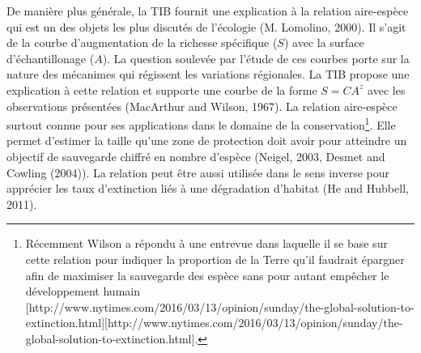 De manière plus générale, la TIB fournit une explication à la relation
aire-espèce qui est un des objets les plus discutés de l'écologie (M.
Lomolino, 2000). Il s'agit de la courbe d'augmentation de la richesse
spécifique (\(S\)) avec la surface d'échantillonage (\(A\)). La question
soulevée par l'étude de ces courbes porte sur la nature des mécanimes
qui régissent les variations régionales. La TIB propose une explication
à cette relation et supporte une courbe de la forme \(S=CA^z\) avec les
observations présentées (MacArthur and Wilson, 1967). La relation
aire-espèce surtout connue pour ses applications dans le domaine de la
conservation\footnote{Récemment Wilson a répondu à une entrevue dans
  laquelle il se base sur cette relation pour indiquer la proportion de
  la Terre qu'il faudrait épargner afin de maximiser la sauvegarde des
  espèce sans pour autant empêcher le développement humain
  {[}http://www.nytimes.com/2016/03/13/opinion/sunday/the-global-solution-to-extinction.html{]}{[}http://www.nytimes.com/2016/03/13/opinion/sunday/the-global-solution-to-extinction.html{]}.}.
Elle permet d'estimer la taille qu'une zone de protection doit avoir
pour atteindre un objectif de sauvegarde chiffré en nombre d'espèce
(Neigel, 2003, Desmet and Cowling (2004)). La relation peut être aussi
utilisée dans le sens inverse pour apprécier les taux d'extinction liés
à une dégradation d'habitat (He and Hubbell, 2011).

